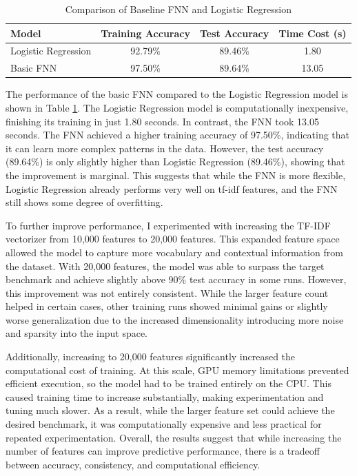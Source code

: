 \documentclass{article}
\begin{document}
\begin{table}[h]
\centering
\caption{Comparison of Baseline FNN and Logistic Regression}
\label{tab:baseline-comparison}
\begin{tabular}{@{}lccc@{}}
\toprule
\textbf{Model} & \textbf{Training Accuracy} & \textbf{Test Accuracy} & \textbf{Time Cost (s)} \\ \midrule
Logistic Regression & 92.79\%  & 89.46\%  & 1.80  \\
Basic FNN & 97.50\%  & 89.64\%  & 13.05  \\ \bottomrule
\end{tabular}
\end{table}

The performance of the basic FNN compared to the Logistic Regression model is shown in Table \ref{tab:baseline-comparison}. The Logistic Regression model is computationally inexpensive, finishing its training in just 1.80 seconds. In contrast, the FNN took 13.05 seconds. The FNN achieved a higher training accuracy of 97.50\%, indicating that it can learn more complex patterns in the data. However, the test accuracy (89.64\%) is only slightly higher than Logistic Regression (89.46\%), showing that the improvement is marginal. This suggests that while the FNN is more flexible, Logistic Regression already performs very well on tf-idf features, and the FNN still shows some degree of overfitting.

To further improve performance, I experimented with increasing the TF-IDF vectorizer from 10,000 features to 20,000 features. This expanded feature space allowed the model to capture more vocabulary and contextual information from the dataset. With 20,000 features, the model was able to surpass the target benchmark and achieve slightly above 90\% test accuracy in some runs. However, this improvement was not entirely consistent. While the larger feature count helped in certain cases, other training runs showed minimal gains or slightly worse generalization due to the increased dimensionality introducing more noise and sparsity into the input space.

Additionally, increasing to 20,000 features significantly increased the computational cost of training. At this scale, GPU memory limitations prevented efficient execution, so the model had to be trained entirely on the CPU. This caused training time to increase substantially, making experimentation and tuning much slower. As a result, while the larger feature set could achieve the desired benchmark, it was computationally expensive and less practical for repeated experimentation. Overall, the results suggest that while increasing the number of features can improve predictive performance, there is a tradeoff between accuracy, consistency, and computational efficiency.
\end{document}
